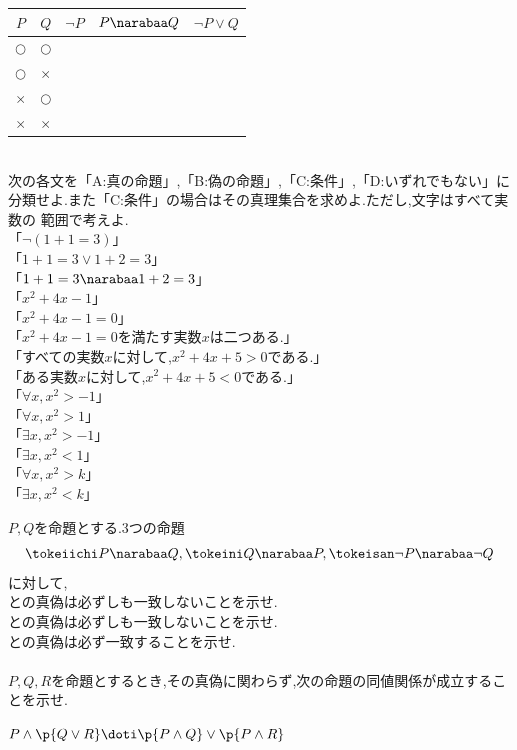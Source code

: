 \documentclass[10pt,fleqn,a4paper]{jsarticle}
\newcommand{\ans}[1]{\mbox{\boldmath{$#1$}}}
\begin{document}
\begin{center}
    \begin{tabular}{|c|c||c|c|c|}
        \hline
        $P$&$Q$&$\neg P$&$P\narabaa Q$&$\neg P\vee Q$\\
        \hline
        $\bigcirc$&$\bigcirc$&{}&{}&{}\\
        \hline
        $\bigcirc$&$\times$&{}&{}&{}\\
        \hline
        $\times$&$\bigcirc$&{}&{}&{}\\
        \hline
        $\times$&$\times$&{}&{}&{}\\
        \hline
        \end{tabular}
\end{center}
\\
次の各文を「A:真の命題」,「B:偽の命題」,「C:条件」,「D:いずれでもない」に分類せよ.また「C:条件」の場合はその真理集合を求めよ.ただし,文字はすべて実数の
範囲で考えよ.\\
\kakkoichi 「$\neg(1+1=3)$」\\
\kakkoni 「$1+1=3\vee1+2=3$」\\
\kakkosan 「$1+1=3\narabaa 1+2=3$」\\
\kakkoshi 「$x^2+4x-1$」\\
\kakkogo 「$x^2+4x-1=0$」\\
\kakkoroku「$x^2+4x-1=0$を満たす実数$x$は二つある.」\\
\kakkoshichi「すべての実数$x$に対して,$x^2+4x+5>0$である.」\\
\kakkohachi「ある実数$x$に対して,$x^2+4x+5<0$である.」\\
\kakkokyu「$\forall x,x^2>-1$」\\
\kakkojyu「$\forall x,x^2>1$」\\
\kakkojyuichi「$\exists x,x^2>-1$」\\
\kakkojyuni「$\exists x,x^2<1$」\\
\kakkojyusan「$\forall x,x^2>k$」\\
\kakkojyushi「$\exists x,x^2<k$」
\newpage
\begin{center}
    \ans{9章の問題演習}
\end{center}
\noindent\reibanichi $P,Q$を命題とする.3つの命題
\begin{align*}
    \tokeiichi P\narabaa Q,\tokeini Q\narabaa P,\tokeisan \neg P\narabaa \neg Q
\end{align*}
に対して,\\
\kakkoichi \tokeiichi と\tokeini の真偽は必ずしも一致しないことを示せ.\\
\kakkoni \tokeiichi と\tokeisan の真偽は必ずしも一致しないことを示せ.\\
\kakkosan \tokeini と\tokeisan の真偽は必ず一致することを示せ.\\\\
\reibanni $P,Q,R$を命題とするとき,その真偽に関わらず,次の命題の同値関係が成立することを示せ.
\begin{center}
    $P\wedge\p{Q\vee R}\doti\p{P\wedge Q}\vee \p{P\wedge R}$
\end{center}
\newpage
\end{document}
